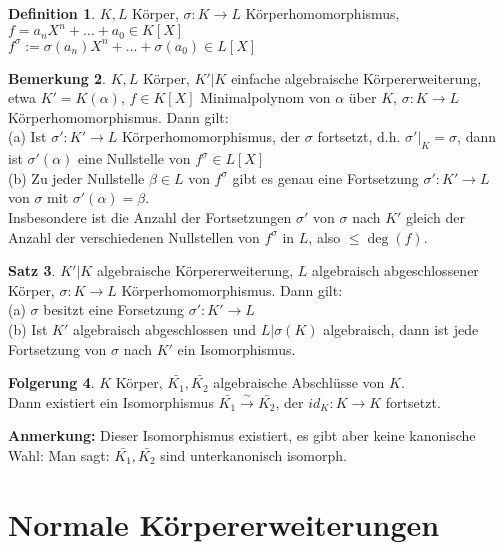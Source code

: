 \documentclass[10pt,a4paper,numbers=endperiod]{scrreprt}
\theoremstyle{definition}
\newtheorem{satz}{Satz}[section]
\newtheorem{defi}[satz]{Definition}
\newtheorem{bem}[satz]{Bemerkung}
\newtheorem{folg}[satz]{Folgerung}
\begin{document}
\begin{defi}
	$K, L$ Körper, $\sigma: K \rightarrow L$ Körperhomomorphismus, $f = a_nX^n+ \ldots + a_0 \in K[X]$\\
	$f^{\sigma} := \sigma(a_n)X^n+ \ldots + \sigma(a_0) \in L[X]$
\end{defi}

\begin{bem}
	$K, L$ Körper, $K'|K$ einfache algebraische Körpererweiterung, etwa $K' = K(\alpha)$, $f \in K[X]$ Minimalpolynom von $\alpha$ über $K$, $\sigma: K \rightarrow L$ Körperhomomorphismus. Dann gilt:\\
	(a) Ist $\sigma': K' \rightarrow L$ Körperhomomorphismus, der $\sigma$ fortsetzt, d.h. $\sigma'|_K= \sigma$, dann ist $\sigma'(\alpha)$ eine Nullstelle von $f^{\sigma} \in L[X]$\\
	(b) Zu jeder Nullstelle $\beta \in L$ von $f^{\sigma}$ gibt es genau eine Fortsetzung $\sigma': K' \rightarrow L$ von $\sigma$ mit $\sigma'(\alpha) = \beta$.\\
	Insbesondere ist die Anzahl der Fortsetzungen $\sigma'$ von $\sigma$ nach $K'$ gleich der Anzahl der verschiedenen Nullstellen von $f^{\sigma}$ in $L$, also $\leq \deg(f)$.
\end{bem}

\begin{satz}
	$K'|K$ algebraische Körpererweiterung, $L$ algebraisch abgeschlossener Körper, $\sigma: K\rightarrow L$ Körperhomomorphismus. Dann gilt:\\
	(a) $\sigma$ besitzt eine Forsetzung $\sigma': K' \rightarrow L$\\
	(b) Ist $K'$ algebraisch abgeschlossen und $L|\sigma(K)$ algebraisch, dann ist jede Fortsetzung von $\sigma$ nach $K'$ ein Isomorphismus.
\end{satz}

\begin{folg}
	$K$ Körper, $\bar{K_1}, \bar{K_2}$ algebraische Abschlüsse von $K$.\\
	Dann existiert ein Isomorphismus $\bar{K_1} \overset{\sim}{\rightarrow} \bar{K_2}$, der $id_K: K \rightarrow K$ fortsetzt.
\end{folg}

\textbf{Anmerkung:} Dieser Isomorphismus existiert, es gibt aber keine kanonische Wahl: Man sagt: $\bar{K_1}, \bar{K_2}$ sind unterkanonisch isomorph.

\chapter{Normale Körpererweiterungen}
\end{document}
